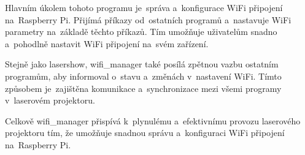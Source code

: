 

Hlavním úkolem tohoto programu je~správa a~konfigurace WiFi připojení na~Raspberry Pi. Přijímá příkazy od~ostatních programů a~nastavuje WiFi parametry na~základě těchto příkazů. Tím umožňuje uživatelům snadno a~pohodlně nastavit WiFi připojení na~svém zařízení.

Stejně jako lasershow, wifi\_manager také posílá zpětnou vazbu ostatním programům, aby informoval o~stavu a~změnách v~nastavení WiFi. Tímto způsobem je~zajištěna komunikace a~synchronizace mezi všemi programy v~laserovém projektoru.

Celkově wifi\_manager přispívá k~plynulému a~efektivnímu provozu laserového projektoru tím, že umožňuje snadnou správu a~konfiguraci WiFi připojení na~Raspberry Pi.